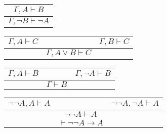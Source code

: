 \begin{lemma}
\begin{center}
\begin{tabular}{ c} 
  $\Gamma, A \vdash B$ \\
 \hline
  $\Gamma, \neg B \vdash \neg A$
\end{tabular}
\end{center}
\end{lemma}
\begin{lemma}
  \begin{center}
  \begin{tabular}{ c c c } 
    $\Gamma, A \vdash C$ & & $\Gamma, B \vdash C$ \\
   \hline
                         & $\Gamma, A \lor B \vdash C$ &\\
  \end{tabular}
  \end{center}
\end{lemma}
\begin{lemma}
\begin{center}
\begin{tabular}{ c c c } 
  $\Gamma, A \vdash B$ & & $\Gamma, \neg A \vdash B$ \\
 \hline
                       & $\Gamma \vdash B$ & \\
\end{tabular}
\end{center}
\end{lemma}
\begin{example}
\begin{center}
\begin{tabular}{ c c c } 
  $\neg \neg A, A \vdash A$ & & $\neg \neg A, \neg A \vdash A$ \\
  \hline
                            & $\neg \neg A \vdash A$ & \\
 \hline
                            & $\vdash \neg \neg A \rightarrow A$ &\\
\end{tabular}
\end{center}
\end{example}

